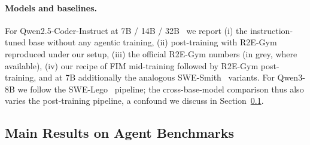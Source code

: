 \paragraph{Models and baselines.}
For Qwen2.5-Coder-Instruct at 7B / 14B / 32B~\citep{qwencoder} we report
(i) the instruction-tuned base without any agentic training, (ii)
post-training with R2E-Gym reproduced under our setup, (iii) the official
R2E-Gym numbers (in grey, where available), (iv) our recipe of FIM
mid-training followed by R2E-Gym post-training, and at 7B additionally
the analogous SWE-Smith~\citep{swesmith} variants. For Qwen3-8B we follow
the SWE-Lego~\citep{swelego} pipeline; the cross-base-model comparison
thus also varies the post-training pipeline, a confound we discuss in
Section~\ref{sec:exp:main}.

\subsection{Main Results on Agent Benchmarks}
\label{sec:exp:main}

